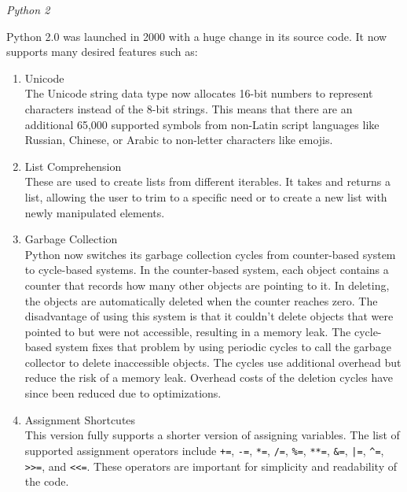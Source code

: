 \documentclass{article}
\begin{document}
\par
\noindent
\textit{Python 2}

\par
Python 2.0 was launched in 2000 with a huge change in its source code. It now supports many desired features such as:
\begin{enumerate}

    \item Unicode\\
    The Unicode string data type now allocates 16-bit numbers to represent characters instead of the 8-bit strings. This means that there are an additional 65,000 supported symbols from non-Latin script languages like Russian, Chinese, or Arabic to non-letter characters like emojis.

    \item List Comprehension\\
    These are used to create lists from different iterables. It takes and returns a list, allowing the user to trim to a specific need or to create a new list with newly manipulated elements.

    \item Garbage Collection\\
    Python now switches its garbage collection cycles from counter-based system to cycle-based systems. In the counter-based system, each object contains a counter that records how many other objects are pointing to it. In deleting, the objects are automatically deleted when the counter reaches zero. The disadvantage of using this system is that it couldn’t delete objects that were pointed to but were not accessible, resulting in a memory leak. The cycle-based system fixes that problem by using periodic cycles to call the garbage collector to delete inaccessible objects. The cycles use additional overhead but reduce the risk of a memory leak. Overhead costs of the deletion cycles have since been reduced due to optimizations.

    \item Assignment Shortcutes\\
    This version fully supports a shorter version of assigning variables. The list of supported assignment operators include \verb|+=|, \verb|-=|, \verb|*=|, \verb|/=|, \verb|%=|, \verb|**=|, \verb|&=|, \verb!|=!, \verb|^=|, \verb|>>=|, and \verb|<<=|. These operators are important for simplicity and readability of the code.


\end{enumerate}
\end{document}
